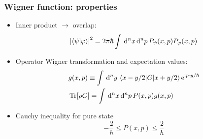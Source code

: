 \documentclass[xcolor=dvipsnames,hyperref={CJKbookmarks=true}]{beamer}
\newcommand{\dif}{\,\mathrm d}
\newcommand\mi{\mathrm{i}}
\newcommand\e{\mathrm{e}}
\DeclareMathOperator{\Tr}{Tr}
\begin{document}
\begin{frame}[t]\frametitle{Wigner function: properties}
\begin{itemize}
	\item Inner product $\rightarrow$ overlap: 
	$$
	  \left|\braket{\psi|\varphi}\right|^2 = 2\pi\hbar \int\dif^n x\dif^n p \,
	  P_\psi(x,p) P_\varphi(x,p)
	$$
	\item Operator Wigner transformation and expectation values: 
	\begin{align*}
		&g(x,p) \equiv \int\dif^n y \, \braket{x-y/2|G|x+y/2}
		\e^{\mi p\cdot y/\hbar} \\
		&\Tr [\rho G] = \int\dif^n x\dif^n p\, P(x,p)g(x,p)
	\end{align*}
	\item Cauchy inequality for pure state
	$$
	 -\frac 2h \le P(x,p) \le \frac 2h
	$$
\end{itemize}
\end{frame}
\end{document}
